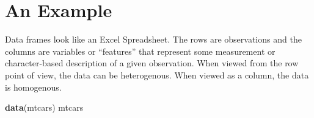 \documentclass[]{book}
\newenvironment{Shaded}{\begin{snugshade}}{\end{snugshade}}
\newcommand{\KeywordTok}[1]{\textcolor[rgb]{0.13,0.29,0.53}{\textbf{#1}}}
\newcommand{\NormalTok}[1]{#1}
\begin{document}
\section{An Example}\label{an-example}

Data frames look like an Excel Spreadsheet. The rows are observations
and the columns are variables or ``features'' that represent some
measurement or character-based description of a given observation. When
viewed from the row point of view, the data can be heterogenous. When
viewed as a column, the data is homogenous.

\begin{Shaded}
\begin{Highlighting}[]
\KeywordTok{data}\NormalTok{(mtcars)}
\NormalTok{mtcars}
\end{Highlighting}
\end{Shaded}
\end{document}
